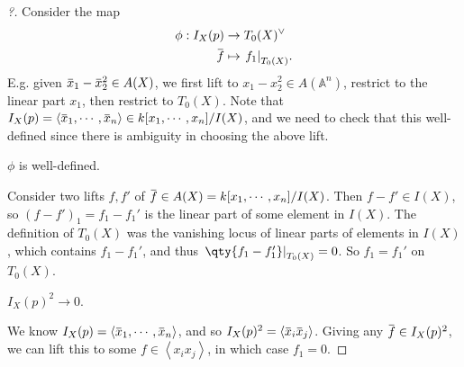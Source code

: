 \begin{proof}[?]

Consider the map
\begin{align*}  
\phi: I_X(p) &\to T_0(X)^\vee\\
\mkern 1.5mu\overline{\mkern-1.5muf\mkern-1.5mu}\mkern 1.5mu &\mapsto { \left.{{f_1}} \right|_{{T_0(X)}} }
.\end{align*}
E.g. given
\(\mkern 1.5mu\overline{\mkern-1.5mux\mkern-1.5mu}\mkern 1.5mu_1 - \mkern 1.5mu\overline{\mkern-1.5mux\mkern-1.5mu}\mkern 1.5mu_2^2 \in A(X)\),
we first lift to \(x_1 - x_2^2 \in A({\mathbb{A}}^n)\), restrict to the
linear part \(x_1\), then restrict to \(T_0(X)\). Note that
\(I_X(p) = \left\langle{\mkern 1.5mu\overline{\mkern-1.5mux\mkern-1.5mu}\mkern 1.5mu_1, \cdots, \mkern 1.5mu\overline{\mkern-1.5mux\mkern-1.5mu}\mkern 1.5mu_n}\right\rangle \in k[x_1, \cdots, x_n]/I(X)\),
and we need to check that this well-defined since there is ambiguity in
choosing the above lift.

\begin{claim}

\(\phi\) is well-defined.

\end{claim}

Consider two lifts \(f, f'\) of
\(\mkern 1.5mu\overline{\mkern-1.5muf\mkern-1.5mu}\mkern 1.5mu\in A(X) = k[x_1, \cdots, x_n]/I(X)\).
Then \(f - f'\in I(X)\), so \((f - f')_1 = f_1 - f_1'\) is the linear
part of some element in \(I(X)\). The definition of \(T_0(X)\) was the
vanishing locus of linear parts of elements in \(I(X)\), which contains
\(f_1 - f_1'\), and thus
\({ \left.{{\qty{f_1 - f_1'} }} \right|_{{T_0(X)}} } = 0\). So
\(f_1 = f_1'\) on \(T_0(X)\).

\begin{claim}

\(I_X(p)^2 \to 0\).

\end{claim}

We know
\(I_X(p) = \left\langle{\mkern 1.5mu\overline{\mkern-1.5mux\mkern-1.5mu}\mkern 1.5mu_1, \cdots, \mkern 1.5mu\overline{\mkern-1.5mux\mkern-1.5mu}\mkern 1.5mu_n}\right\rangle\),
and so
\(I_X(p)^2 = \left\langle{\mkern 1.5mu\overline{\mkern-1.5mux\mkern-1.5mu}\mkern 1.5mu_i \mkern 1.5mu\overline{\mkern-1.5mux\mkern-1.5mu}\mkern 1.5mu_j}\right\rangle\).
Giving any
\(\mkern 1.5mu\overline{\mkern-1.5muf\mkern-1.5mu}\mkern 1.5mu\in I_X(p)^2\),
we can lift this to some \(f\in \left\langle{x_i x_j}\right\rangle\), in
which case \(f_1 = 0\).


\end{proof}
